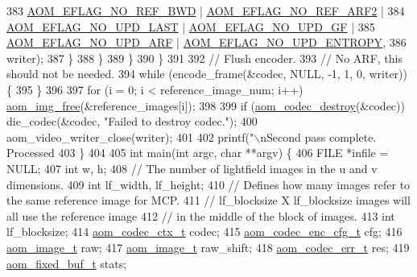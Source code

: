 \begin{DoxyCodeInclude}
{{{{{{{{{383                            \hyperlink{group__aom__encoder_ga758649aa6cd9fefb15ad888489884a38}{AOM\_EFLAG\_NO\_REF\_BWD} | 
      \hyperlink{group__aom__encoder_gad04799a74215e1b9609f7ccd1766f8c9}{AOM\_EFLAG\_NO\_REF\_ARF2} |
384                            \hyperlink{group__aom__encoder_ga7a55a46970c074b761319c5c46d87b6e}{AOM\_EFLAG\_NO\_UPD\_LAST} | 
      \hyperlink{group__aom__encoder_gaa81cc31f95fd463f51a158050d267a36}{AOM\_EFLAG\_NO\_UPD\_GF} |
385                            \hyperlink{group__aom__encoder_ga469b4cf5ff76cb30de951e129c25a786}{AOM\_EFLAG\_NO\_UPD\_ARF} | 
      \hyperlink{group__aom__encoder_gac5a69f04b0bc88f755587a1da815d754}{AOM\_EFLAG\_NO\_UPD\_ENTROPY},
386                        writer);
387         \}
388       \}
389     \}
390   \}
391 
392   \textcolor{comment}{// Flush encoder.}
393   \textcolor{comment}{// No ARF, this should not be needed.}
394   \textcolor{keywordflow}{while} (encode\_frame(&codec, NULL, -1, 1, 0, writer)) \{
395   \}
396 
397   \textcolor{keywordflow}{for} (i = 0; i < reference\_image\_num; i++) \hyperlink{aom__image_8h_afff22f7f3eb9409c5b678d1962f110a8}{aom\_img\_free}(&reference\_images[i]);
398 
399   \textcolor{keywordflow}{if} (\hyperlink{group__codec_ga9b60e186f61ba2d6ab2b8069b76a15c5}{aom\_codec\_destroy}(&codec)) die\_codec(&codec, \textcolor{stringliteral}{"Failed to destroy codec."});
400   aom\_video\_writer\_close(writer);
401 
402   printf(\textcolor{stringliteral}{"\(\backslash\)nSecond pass complete. Processed %
403 \}
404 
405 \textcolor{keywordtype}{int} main(\textcolor{keywordtype}{int} argc, \textcolor{keywordtype}{char} **argv) \{
406   FILE *infile = NULL;
407   \textcolor{keywordtype}{int} w, h;
408   \textcolor{comment}{// The number of lightfield images in the u and v dimensions.}
409   \textcolor{keywordtype}{int} lf\_width, lf\_height;
410   \textcolor{comment}{// Defines how many images refer to the same reference image for MCP.}
411   \textcolor{comment}{// lf\_blocksize X lf\_blocksize images will all use the reference image}
412   \textcolor{comment}{// in the middle of the block of images.}
413   \textcolor{keywordtype}{int} lf\_blocksize;
414   \hyperlink{structaom__codec__ctx}{aom\_codec\_ctx\_t} codec;
415   \hyperlink{structaom__codec__enc__cfg}{aom\_codec\_enc\_cfg\_t} cfg;
416   \hyperlink{structaom__image}{aom\_image\_t} raw;
417   \hyperlink{structaom__image}{aom\_image\_t} raw\_shift;
418   \hyperlink{group__codec_gaaae61e0f8663e6137f1e228757248e7c}{aom\_codec\_err\_t} res;
419   \hyperlink{structaom__fixed__buf}{aom\_fixed\_buf\_t} stats;
}}}}}}}}}}
\end{DoxyCodeInclude}
